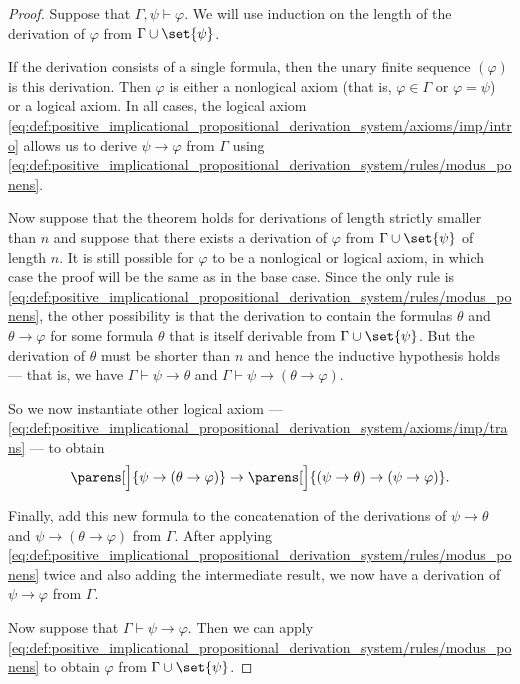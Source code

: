 \begin{proof}
  \SufficiencySubProof Suppose that \( \Gamma, \psi \vdash \varphi \). We will use induction on the length of the derivation of \( \varphi \) from \( \Gamma \cup \set{ \psi } \).

  If the derivation consists of a single formula, then the unary finite sequence \( (\varphi) \) is this derivation. Then \( \varphi \) is either a nonlogical axiom (that is, \( \varphi \in \Gamma \) or \( \varphi = \psi \)) or a logical axiom. In all cases, the logical axiom \eqref{eq:def:positive_implicational_propositional_derivation_system/axioms/imp/intro} allows us to derive \( \psi \rightarrow \varphi \) from \( \Gamma \) using \eqref{eq:def:positive_implicational_propositional_derivation_system/rules/modus_ponens}.

  Now suppose that the theorem holds for derivations of length strictly smaller than \( n \) and suppose that there exists a derivation of \( \varphi \) from \( \Gamma \cup \set{ \psi } \) of length \( n \). It is still possible for \( \varphi \) to be a nonlogical or logical axiom, in which case the proof will be the same as in the base case. Since the only rule is \eqref{eq:def:positive_implicational_propositional_derivation_system/rules/modus_ponens}, the other possibility is that the derivation to contain the formulas \( \theta \) and \( \theta \rightarrow \varphi \) for some formula \( \theta \) that is itself derivable from \( \Gamma \cup \set{ \psi } \). But the derivation of \( \theta \) must be shorter than \( n \) and hence the inductive hypothesis holds --- that is, we have \( \Gamma \vdash \psi \rightarrow \theta \) and \( \Gamma \vdash \psi \rightarrow (\theta \rightarrow \varphi) \).

  So we now instantiate other logical axiom --- \eqref{eq:def:positive_implicational_propositional_derivation_system/axioms/imp/trans} --- to obtain
  \begin{equation*}
    \parens[\Big]{ \psi \rightarrow (\theta \rightarrow \varphi) } \rightarrow \parens[\Big]{ (\psi \rightarrow \theta) \rightarrow (\psi \rightarrow \varphi)}.
  \end{equation*}

  Finally, add this new formula to the concatenation of the derivations of \( \psi \rightarrow \theta \) and \( \psi \rightarrow (\theta \rightarrow \varphi) \) from \( \Gamma \). After applying \eqref{eq:def:positive_implicational_propositional_derivation_system/rules/modus_ponens} twice and also adding the intermediate result, we now have a derivation of \( \psi \rightarrow \varphi \) from \( \Gamma \).

  \NecessitySubProof Now suppose that \( \Gamma \vdash \psi \rightarrow \varphi \). Then we can apply \eqref{eq:def:positive_implicational_propositional_derivation_system/rules/modus_ponens} to obtain \( \varphi \) from \( \Gamma \cup \set{ \psi } \).
\end{proof}

